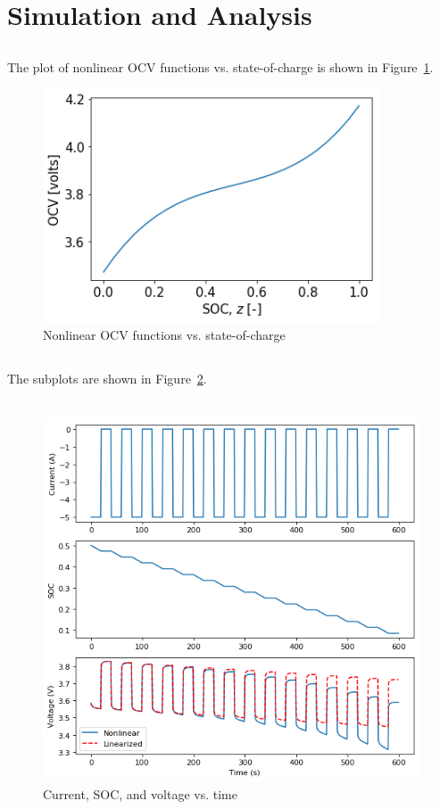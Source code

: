 \documentclass[12pt]{article}
\begin{document}
\section{Simulation and Analysis}
\subsection{}

The plot of nonlinear OCV functions vs. state-of-charge is shown in Figure~\ref{fig:OCVnl}.
\begin{figure}[!htb]
	\centering
	\includegraphics[width=10cm]{7a.png}      
	\caption{Nonlinear OCV functions vs. state-of-charge}
	\label{fig:OCVnl}
\end{figure}
\subsection{}

The subplots are shown in Figure~\ref{fig:sim}.\\\\
\begin{figure}[!htb]
	\centering
	\includegraphics[width=15cm]{7b.png}      
	\caption{Current, SOC, and voltage vs. time}
	\label{fig:sim}
\end{figure}
\end{document}
